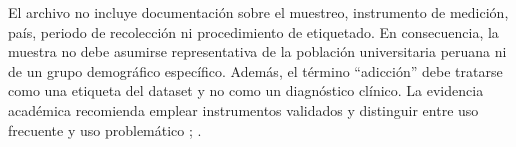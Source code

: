 \documentclass[11pt,spanish,a4paper,]{article}
\begin{document}
El archivo no incluye documentación sobre el muestreo, instrumento de
medición, país, periodo de recolección ni procedimiento de etiquetado.
En consecuencia, la muestra no debe asumirse representativa de la
población universitaria peruana ni de un grupo demográfico específico.
Además, el término ``adicción'' debe tratarse como una etiqueta del
dataset y no como un diagnóstico clínico. La evidencia académica
recomienda emplear instrumentos validados y distinguir entre uso
frecuente y uso problemático \textcite{Kwon2013}; \textcite{Csibi2018}.

\printbibliography[title=Referencias]
\end{document}
